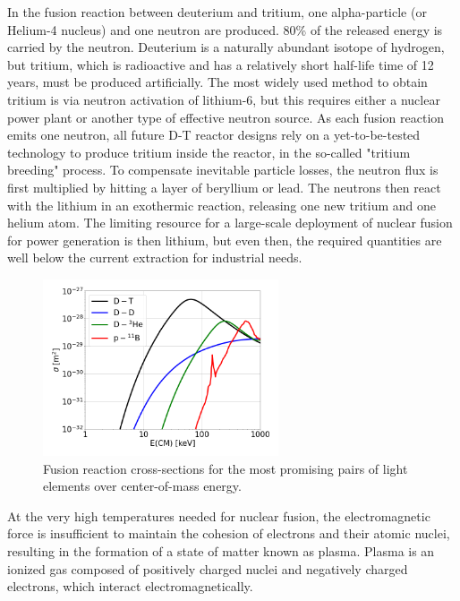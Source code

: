 In the fusion reaction between deuterium and tritium, one alpha-particle (or Helium-4 nucleus) and one neutron are produced. 80\% of the released energy is carried by the neutron. Deuterium is a naturally abundant isotope of hydrogen, but tritium, which is radioactive and has a relatively short half-life time of 12 years, must be produced artificially. The most widely used method to obtain tritium is via neutron activation of lithium-6, but this requires either a nuclear power plant or another type of effective neutron source. As each fusion reaction emits one neutron, all future D-T reactor designs rely on a yet-to-be-tested technology to produce tritium inside the reactor, in the so-called "tritium breeding" process. To compensate inevitable particle losses, the neutron flux is first multiplied by hitting a layer of beryllium or lead. The neutrons then react with the lithium in an exothermic reaction, releasing one new tritium and one helium atom. The limiting resource for a large-scale deployment of nuclear fusion for power generation is then lithium, but even then, the required quantities are well below the current extraction for industrial needs. \\


\begin{figure}[H]
	\centering
	\includegraphics[width=0.62\textwidth]{schemes/fusion-xsecs2.png}
	\caption[Fusion reaction cross-sections for the most promising pairs of light elements over center-of-mass energy]{Fusion reaction cross-sections for the most promising pairs of light elements over center-of-mass energy.}
	\label{fig:Intro_fusionCrossSections}
\end{figure}


At the very high temperatures needed for nuclear fusion, the electromagnetic force is insufficient to maintain the cohesion of electrons and their atomic nuclei, resulting in the formation of a state of matter known as plasma. Plasma is an ionized gas composed of positively charged nuclei and negatively charged electrons, which interact electromagnetically. \newline

